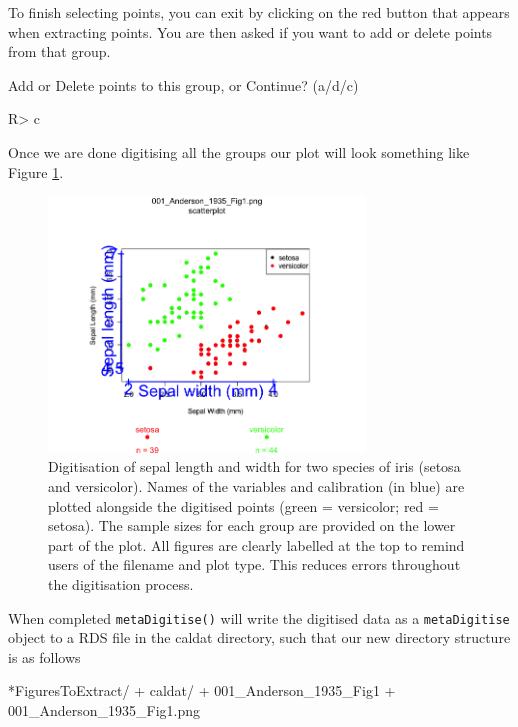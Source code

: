 \documentclass[12pt]{article}
\newcommand{\code}[1]{\texttt{#1}}
\newcommand{\fct}[1]{\texttt{#1()}}
\begin{document}
To finish selecting points, you can exit by clicking on the red button that appears when extracting points. You are then asked if you want to add or delete points from that group. 

\begin{CodeChunk}
\begin{CodeOutput}
Add or Delete points to this group, or Continue? (a/d/c) 
\end{CodeOutput}
\begin{CodeInput}
R> c
\end{CodeInput}
\end{CodeChunk}

Once we are done digitising all the groups our plot will look something like Figure \ref{fig:scatter_extract}.

\begin{figure}[!h] 
\centering
 \includegraphics[width=0.75\textwidth]{001_Anderson_1935_Fig1_digitised.png} 
 \caption{Digitisation of sepal length and width for two species of iris (setosa and versicolor). Names of the variables and calibration (in blue) are plotted alongside the digitised points (green = versicolor; red = setosa). The sample sizes for each group are provided on the lower part of the plot. All figures are clearly labelled at the top to remind users of the filename and plot type. This reduces errors throughout the digitisation process.}
\label{fig:scatter_extract}
\end{figure}

When completed \fct{metaDigitise} will write the digitised data as a \code{metaDigitise} object to a RDS file in the caldat directory, such that our new directory structure is as follows

\begin{CodeChunk}
\begin{CodeOutput}
*FiguresToExtract/
    + caldat/
        + 001_Anderson_1935_Fig1
    + 001_Anderson_1935_Fig1.png
\end{CodeOutput}
\end{CodeChunk}
\end{document}
